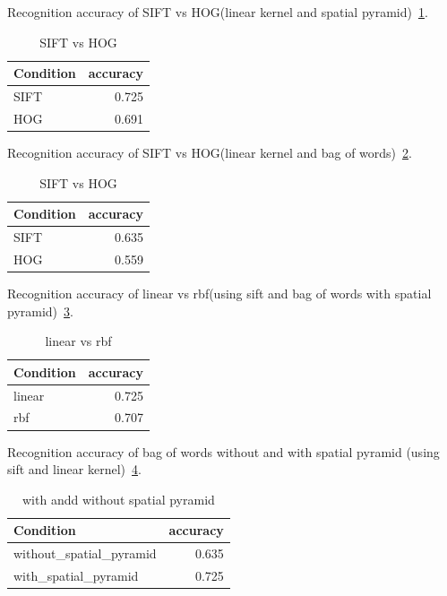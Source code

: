 Recognition accuracy of SIFT vs HOG(linear kernel and spatial pyramid)~\ref{tab:table1}.

\begin{table}[h]
    \centering
    \begin{tabular}{lr}
        \toprule
        Condition & accuracy \\
        \midrule
        SIFT & 0.725 \\
        HOG & 0.691 \\
        \bottomrule
    \end{tabular}
    \caption{SIFT vs HOG}
    \label{tab:table1}
\end{table}

Recognition accuracy of SIFT vs HOG(linear kernel and bag of words)~\ref{tab:table2}.

\begin{table}[h]
    \centering
    \begin{tabular}{lr}
        \toprule
        Condition & accuracy \\
        \midrule
        SIFT & 0.635 \\
        HOG & 0.559 \\
        \bottomrule
    \end{tabular}
    \caption{SIFT vs HOG}
    \label{tab:table2}
\end{table}

Recognition accuracy of linear vs rbf(using sift and bag of words with spatial pyramid)~\ref{tab:table3}.

\begin{table}[h]
    \centering
    \begin{tabular}{lr}
        \toprule
        Condition & accuracy \\
        \midrule
        linear & 0.725\\
        rbf & 0.707\\
        \bottomrule
    \end{tabular}
    \caption{linear vs rbf}
    \label{tab:table3}
\end{table}

Recognition accuracy of bag of words without and with spatial pyramid (using sift and linear kernel)~\ref{tab:table4}.

\begin{table}[h]
    \centering
    \begin{tabular}{lr}
        \toprule
        Condition & accuracy\\
        \midrule
        without\_spatial\_pyramid & 0.635\\
        with\_spatial\_pyramid & 0.725\\
        \bottomrule
    \end{tabular}
    \caption{with andd without spatial pyramid}
    \label{tab:table4}
\end{table}

